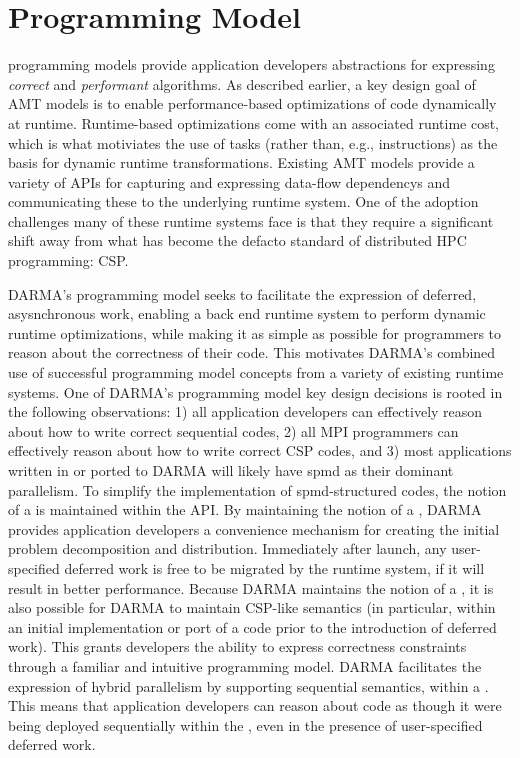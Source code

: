 

\section{Programming Model}
\label{sec:programmingmodel}


\Glspl{programming model} provide application developers 
abstractions for expressing \emph{correct} and \emph{performant} algorithms. 
As described earlier, a key design goal of \gls{AMT} models is to enable performance-based
optimizations of code dynamically at runtime.
Runtime-based optimizations come with an associated runtime cost, which is what
motiviates the use of \glspl{task} (rather than, e.g., instructions) as the basis for dynamic runtime transformations.
Existing \gls{AMT} models provide a variety of \glspl{API} for capturing and expressing
\glspl{data-flow dependency} and communicating these to the underlying
\gls{runtime system}.  
One of the adoption challenges many of these \glspl{runtime system} face is
that they require a significant shift away from what has become
the defacto standard of distributed HPC programming: \gls{CSP}. 

\gls{DARMA}'s \gls{programming model} seeks to facilitate the expression of
deferred, asysnchronous work, enabling a \gls{back end} \gls{runtime system}
to perform dynamic runtime optimizations, while making it as simple as possible
for programmers to reason about the correctness of their code.
This motivates \gls{DARMA}'s combined use of successful \gls{programming model}
concepts from a variety of existing \glspl{runtime system}. 
One of \gls{DARMA}'s \gls{programming model} key design decisions is rooted in
the following observations: 
1) all application
developers can effectively reason about how to write correct sequential codes,
2) all MPI
programmers can effectively reason about how to write correct \gls{CSP} codes,
and
3) most applications written in or ported to \gls{DARMA} will likely
have \gls{spmd} as their dominant parallelism.
To simplify the implementation of \gls{spmd}-structured codes, the notion of a
 is maintained within the \gls{API}.   
By maintaining the notion of a , \gls{DARMA} provides application developers a convenience mechanism for creating
the initial problem decomposition and distribution.
Immediately after launch, any user-specified \gls{deferred work} is free to be
migrated by the \gls{runtime system}, if it will result in
better performance.
Because \gls{DARMA} maintains the notion of a , it is also
possible for \gls{DARMA} to maintain \gls{CSP}-like semantics (in particular, within an initial
implementation or port of a code prior to the introduction of \gls{deferred
work}). 
This grants developers the ability to express correctness constraints through a familiar and
intuitive \gls{programming model}.  
\gls{DARMA} facilitates the expression of hybrid parallelism by supporting  
\gls{sequential semantics}, within a .  This means that application
developers can reason about code as
though it were being deployed sequentially within the , even in
the presence of user-specified \gls{deferred work}.   

